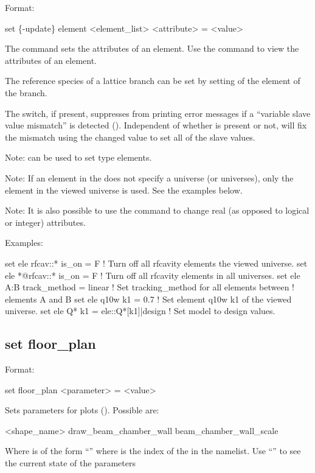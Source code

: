 {{{Format:
\begin{example}
  set \{-update\} element <element_list> <attribute> = <value>
\end{example}

The  command sets the attributes of an element. Use the 
command to view the attributes of an element.

The reference species of a lattice branch can be set by setting  of the 
 element of the branch.

The  switch, if present, suppresses \tao from printing error messages if a ``variable
slave value mismatch'' is detected (). Independent of whether  is
present or not, \tao will fix the mismatch using the changed value to set all of the slave values.

Note:  can be used to set  type elements.

Note: If an element in the  does not specify a universe (or universes),
only the element in the viewed universe is used. See the examples below.

Note: It is also possible to use the  command to change real (as opposed to
logical or integer) attributes.

Examples:
\begin{example}
  set ele rfcav::* is_on = F         ! Turn off all rfcavity elements the viewed universe.
  set ele *@rfcav::* is_on = F       ! Turn off all rfcavity elements in all universes.
  set ele A:B track_method = linear  ! Set tracking_method for all elements between 
                                     !   elements A and B
  set ele q10w k1 = 0.7              ! Set element q10w k1 of the viewed universe.
  set ele Q* k1 = ele::Q*[k1]|design ! Set model to design values.
\end{example}


\subsection{set floor_plan}
\label{s:set.floor.plan}

Format:
\begin{example}
  set floor_plan <parameter> = <value>
\end{example}


Sets parameters for  plots ().  Possible  are:
\begin{example}
  <shape_name>%
  draw_beam_chamber_wall
  beam_chamber_wall_scale
\end{example}
Where  is of the form ``'' where  is the index of
the  in the  namelist.  Use ``'' to
see the current state of the  parameters

}}}
